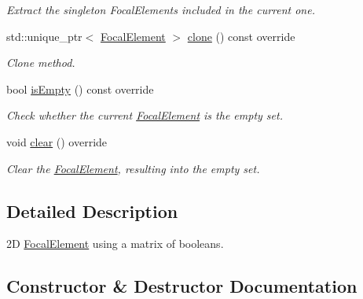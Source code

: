 \begin{DoxyCompactItemize}
\begin{DoxyCompactList}\small\item\em Extract the singleton Focal\+Elements included in the current one. \end{DoxyCompactList}\item 
std\+::unique\+\_\+ptr$<$ \hyperlink{classFocalElement}{Focal\+Element} $>$ \hyperlink{classEigenFE_1_1EigenMat2DFocalElement_a7b11a9c1a340338ddc0502c04c3ebb50}{clone} () const override
\begin{DoxyCompactList}\small\item\em Clone method. \end{DoxyCompactList}\item 
bool \hyperlink{classEigenFE_1_1EigenMat2DFocalElement_af0b7bcf11590355059f49c59c51aea3f}{is\+Empty} () const override
\begin{DoxyCompactList}\small\item\em Check whether the current \hyperlink{classFocalElement}{Focal\+Element} is the empty set. \end{DoxyCompactList}\item 
void \hyperlink{classEigenFE_1_1EigenMat2DFocalElement_a32f67417ea35cb7d330d8ca27472c863}{clear} () override
\begin{DoxyCompactList}\small\item\em Clear the \hyperlink{classFocalElement}{Focal\+Element}, resulting into the empty set. \end{DoxyCompactList}\end{DoxyCompactItemize}


\subsection{Detailed Description}
2D \hyperlink{classFocalElement}{Focal\+Element} using a matrix of booleans. 

\subsection{Constructor \& Destructor Documentation}
